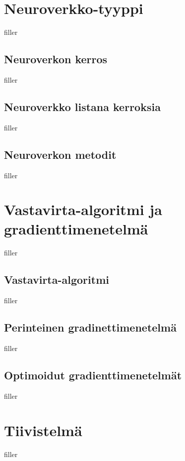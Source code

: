 \documentclass{article}
\begin{document}
\section{Neuroverkko-tyyppi}

filler

\subsection{Neuroverkon kerros}

filler

\subsection{Neuroverkko listana kerroksia}

filler

\subsection{Neuroverkon metodit}

filler

\section{Vastavirta-algoritmi ja gradienttimenetelmä}

filler

\subsection{Vastavirta-algoritmi}

filler

\subsection{Perinteinen gradinettimenetelmä}

filler

\subsection{Optimoidut gradienttimenetelmät}

filler

\section{Tiivistelmä}

filler

\printbibliography
\end{document}
